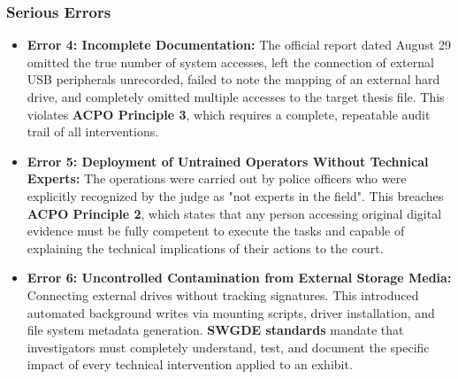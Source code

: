 \subsubsection*{Serious Errors}
\begin{itemize}
    \item \textbf{Error 4: Incomplete Documentation:} The official report dated August 29 omitted the true number of system accesses, left the connection of external USB peripherals unrecorded, failed to note the mapping of an external hard drive, and completely omitted multiple accesses to the target thesis file. This violates \textbf{ACPO Principle 3}, which requires a complete, repeatable audit trail of all interventions.
    \item \textbf{Error 5: Deployment of Untrained Operators Without Technical Experts:} The operations were carried out by police officers who were explicitly recognized by the judge as "not experts in the field". This breaches \textbf{ACPO Principle 2}, which states that any person accessing original digital evidence must be fully competent to execute the tasks and capable of explaining the technical implications of their actions to the court.
    \item \textbf{Error 6: Uncontrolled Contamination from External Storage Media:} Connecting external drives without tracking signatures. This introduced automated background writes via mounting scripts, driver installation, and file system metadata generation. \textbf{SWGDE standards} mandate that investigators must completely understand, test, and document the specific impact of every technical intervention applied to an exhibit.
\end{itemize}

